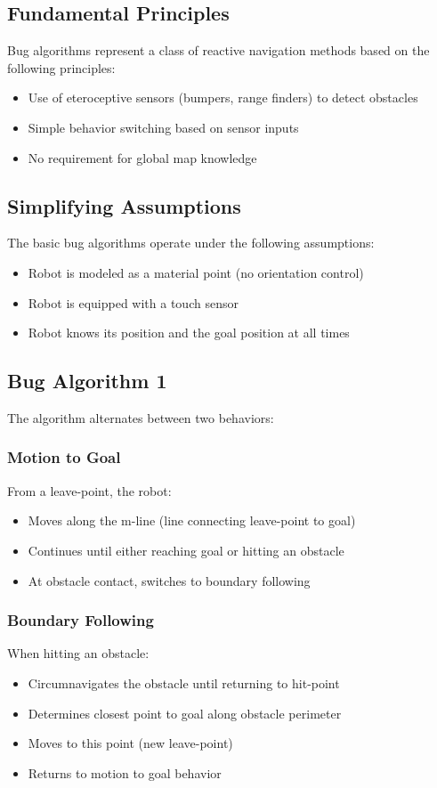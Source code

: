 \documentclass[openany]{book}
\theoremstyle{definition}
\theoremstyle{remark}
\begin{document}
\subsection{Fundamental Principles}

Bug algorithms represent a class of reactive navigation methods based on the following principles:

\begin{itemize}
    \item Use of eteroceptive sensors (bumpers, range finders) to detect obstacles
    \item Simple behavior switching based on sensor inputs
    \item No requirement for global map knowledge
\end{itemize}

\subsection{Simplifying Assumptions}
The basic bug algorithms operate under the following assumptions:
\begin{itemize}
    \item Robot is modeled as a material point (no orientation control)
    \item Robot is equipped with a touch sensor
    \item Robot knows its position and the goal position at all times
\end{itemize}

\subsection{Bug Algorithm 1}

The algorithm alternates between two behaviors:

\subsubsection{Motion to Goal}
From a leave-point, the robot:
\begin{itemize}
    \item Moves along the m-line (line connecting leave-point to goal)
    \item Continues until either reaching goal or hitting an obstacle
    \item At obstacle contact, switches to boundary following
\end{itemize}

\subsubsection{Boundary Following}
When hitting an obstacle:
\begin{itemize}
    \item Circumnavigates the obstacle until returning to hit-point
    \item Determines closest point to goal along obstacle perimeter
    \item Moves to this point (new leave-point)
    \item Returns to motion to goal behavior
\end{itemize}
\end{document}
